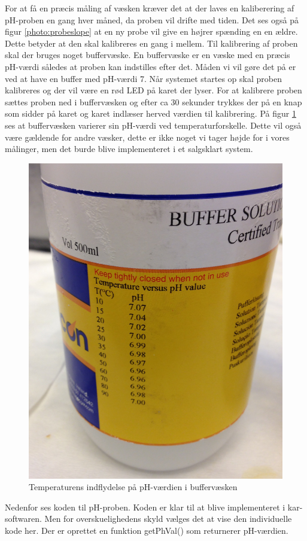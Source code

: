 For at få en præcis måling af væsken kræver det at der laves en kaliberering af pH-proben en gang hver måned, da proben vil drifte med tiden. Det ses også på figur \ref{photo:probeslope} at en ny probe vil give en højrer spænding en en ældre. Dette betyder at den skal kalibreres en gang i mellem. Til kalibrering af proben skal der bruges noget buffervæske. En buffervæske er en væske med en præcis pH-værdi således at proben kan indstilles efter det. Måden vi vil gøre det på er ved at have en buffer med pH-værdi 7. Når systemet startes op skal proben kalibreres og der vil være en rød LED på karet der lyser. For at kalibrere proben sættes proben ned i buffervæsken og efter ca 30 sekunder trykkes der på en knap som sidder på karet og karet indlæser herved værdien til kalibrering. På figur \ref{photo:buffer_vaeske} ses at buffervæsken varierer sin pH-værdi ved temperaturforskelle. Dette vil også være gældende for andre væsker, dette er ikke noget vi tager højde for i vores målinger, men det burde blive implementeret i et salgsklart system. 

 \begin{figure}[H]
	\centering 
	\includegraphics[scale=0.1]{HardwareArkitektur/Sensore/pH_probe_billeder/buffervaeske.jpg}
	\caption{Temperaturens indflydelse på pH-værdien i buffervæsken}
	\label{photo:buffer_vaeske}
\end{figure} 
Nedenfor ses koden til pH-proben. Koden er klar til at blive implementeret i kar-softwaren. Men for overskuelighedens skyld vælges det at vise den individuelle kode her. Der er oprettet en funktion getPhVal() som returnerer pH-værdien.


